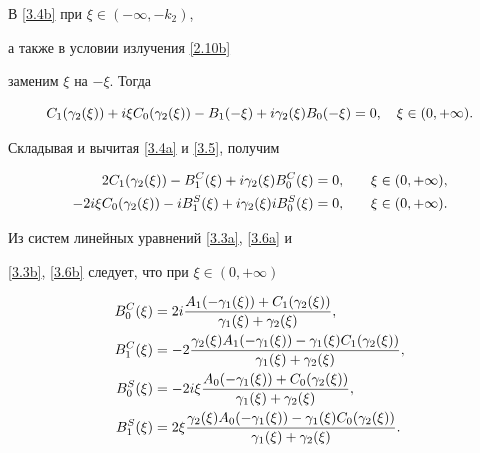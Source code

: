 В \eqref{3.4b} при $\xi\in(-\infty,-k_2)$,


а также в условии излучения \eqref{2.10b}


заменим $\xi$ на $-\xi$. Тогда


\begin{equation}\label{3.5}


C_1(\gasxi)+i\xi C_0(\gasxi)


-B_1(-\xi)+i\gasxi B_0(-\xi) = 0,\quad \xi\in(0,+\infty) .


\end{equation}


Складывая и вычитая \eqref{3.4a} и \eqref{3.5}, получим


\begin{alignat}{2}


\label{3.6a}


2C_1(\gasxi)-B^C_1(\xi)+i\gasxi B^C_0(\xi) &= 0,&\quad


\xi&\in(0,+\infty),\\


%


\label{3.6b}


-2i\xi C_0(\gasxi)-iB^S_1(\xi)+i\gasxi iB^S_0(\xi) &= 0,&\quad


\xi&\in(0,+\infty).


\end{alignat}





Из систем линейных уравнений \eqref{3.3a}, \eqref{3.6a} и


\eqref{3.3b}, \eqref{3.6b} следует, что при $\xi\in(0,+\infty)$


\begin{equation}\label{3.7}


\begin{split}


B^C_0(\xi) &= \di 2i\frac{A_1(-\gafxi)+C_1(\gasxi)}


{\gafxi+\gasxi} ,\\


B^C_1(\xi) &= \di -2\frac{\gasxi A_1(-\gafxi)


-\gafxi C_1(\gasxi)}  {\gafxi+\gasxi} ,\\


B^S_0(\xi) &= \di -2i\xi\frac{A_0(-\gafxi)+C_0(\gasxi)}


{\gafxi+\gasxi} ,\\


B^S_1(\xi) &= \di 2\xi\frac{\gasxi A_0(-\gafxi)


-\gafxi C_0(\gasxi)}


{\gafxi+\gasxi} .


\end{split}


\end{equation}


